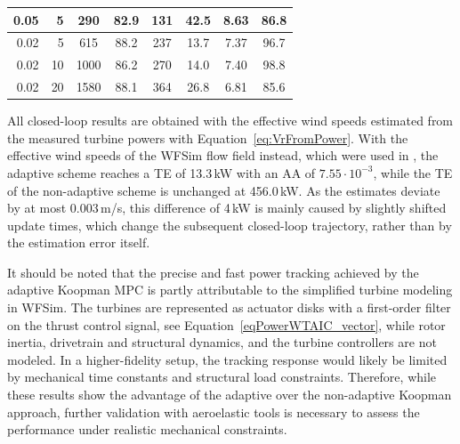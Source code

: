 \begin{table}[htbp]
\begin{tabular}{rr cc cccc}
        0.05 & 5 & 290 & 82.9 & 131 & 42.5 & 8.63 & 86.8 \\
        \midrule
        0.02 & 5 & 615 & 88.2 & 237 & 13.7 & 7.37 & 96.7 \\
        0.02 & 10 & 1000 & 86.2 & 270 & 14.0 & 7.40 & 98.8 \\
        0.02 & 20 & 1580 & 88.1 & 364 & 26.8 & 6.81 & 85.6 \\
        \bottomrule
    \end{tabular}
\end{table}

All closed-loop results are obtained with the effective wind speeds estimated from the measured turbine powers with Equation~\eqref{eq:VrFromPower}. With the effective wind speeds of the WFSim flow field instead, which were used in \cite{dittmer2022data}, the adaptive scheme reaches a TE of 13.3\,kW with an AA of $7.55\cdot 10^{-3}$, while the TE of the non-adaptive scheme is unchanged at 456.0\,kW. As the estimates deviate by at most 0.003\,m/s, this difference of 4\,kW is mainly caused by slightly shifted update times, which change the subsequent closed-loop trajectory, rather than by the estimation error itself.

It should be noted that the precise and fast power tracking achieved by the adaptive Koopman MPC is partly attributable to the simplified turbine modeling in WFSim. The turbines are represented as actuator disks with a first-order filter on the thrust control signal, see Equation~\eqref{eqPowerWTAIC_vector}, while rotor inertia, drivetrain and structural dynamics, and the turbine controllers are not modeled. In a higher-fidelity setup, the tracking response would likely be limited by mechanical time constants and structural load constraints. Therefore, while these results show the advantage of the adaptive over the non-adaptive Koopman approach, further validation with aeroelastic tools is necessary to assess the performance under realistic mechanical constraints.

